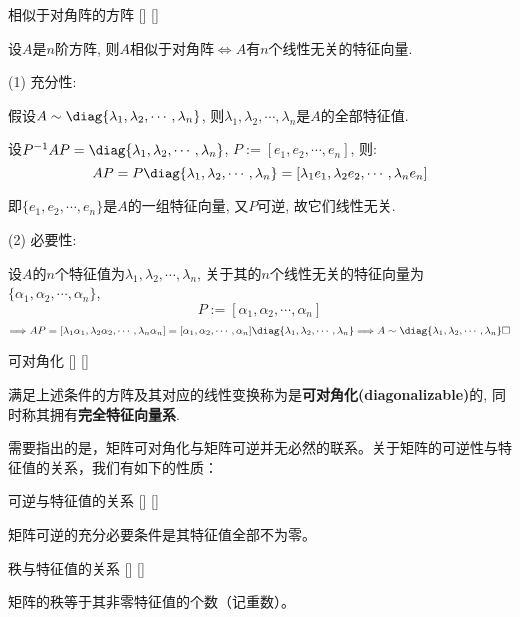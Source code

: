 \documentclass[UTF8]{ctexart}
\begin{document}
		\begin{thm}
			[]
			{相似于对角阵的方阵}
			[]
			[]

			设$A$是$n$阶方阵, 则$A$相似于对角阵$\iff A$有$n$个线性无关的特征向量. 
		\end{thm}

        \begin{prf}

			(1) 充分性: 
			
			假设$A\sim\diag\{\lambda_1,\lambda_2,\cdots,\lambda_n\}$, 则$\lambda_1,\lambda_2,\cdots,\lambda_n$是$A$的全部特征值. 

			设$P^{-1}AP=\diag\{\lambda_1,\lambda_2,\cdots,\lambda_n\}$, $P:=[e_1,e_2,\cdots,e_n]$, 则: 
			\[AP=P\diag\{\lambda_1,\lambda_2,\cdots,\lambda_n\}=[\lambda_1 e_1,\lambda_2 e_2,\cdots,\lambda_n e_n]\]

			即$\{e_1,e_2,\cdots,e_n\}$是$A$的一组特征向量, 又$P$可逆, 故它们线性无关. 

			(2) 必要性: 
			
			设$A$的$n$个特征值为$\lambda_1,\lambda_2,\cdots,\lambda_n$, 关于其的$n$个线性无关的特征向量为$\{\alpha_1,\alpha_2,\cdots,\alpha_n\}$, 
			\[P:=[\alpha_1,\alpha_2,\cdots,\alpha_n]\]
			\[\Longrightarrow AP=[\lambda_1\alpha_1,\lambda_2\alpha_2,\cdots,\lambda_n\alpha_n]=[\alpha_1,\alpha_2,\cdots,\alpha_n]\diag\{\lambda_1,\lambda_2,\cdots,\lambda_n\}\Longrightarrow A\sim\diag\{\lambda_1,\lambda_2,\cdots,\lambda_n\}\square\]
        \end{prf}
		
		\begin{dfn}
			[]
			{可对角化}
			[]
			[]

			满足上述条件的方阵及其对应的线性变换称为是\textbf{可对角化(diagonalizable)}的, 同时称其拥有\textbf{完全特征向量系}. 
		\end{dfn}

		需要指出的是，矩阵可对角化与矩阵可逆并无必然的联系。关于矩阵的可逆性与特征值的关系，我们有如下的性质：

		\begin{ppt}
			[]
			{可逆与特征值的关系}
			[]
			[]

			矩阵可逆的充分必要条件是其特征值全部不为零。
		\end{ppt}

		\begin{ppt}
			[]
			{秩与特征值的关系}
			[]
			[]

			矩阵的秩等于其非零特征值的个数（记重数）。
		\end{ppt}
		
\end{document}
